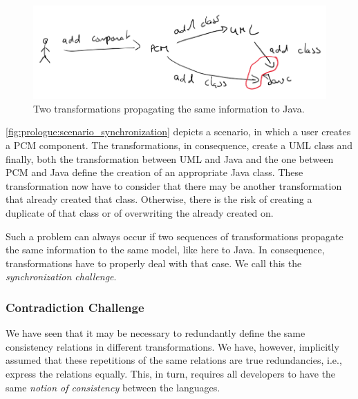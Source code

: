 \begin{figure}
    \centering
    \includegraphics[width=\textwidth]{figures/prologue/scenario_synchronization.png}
    \caption[Example for transformation synchronization]{Two transformations propagating the same information to Java.}
    \label{fig:prologue:scenario_synchronization}
\end{figure}

\autoref{fig:prologue:scenario_synchronization} depicts a scenario, in which a user creates a \gls{PCM} component.
The transformations, in consequence, create a \gls{UML} class and finally, both the transformation between \gls{UML} and Java and the one between \gls{PCM} and Java define the creation of an appropriate Java class.
These transformation now have to consider that there may be another transformation that already created that class.
Otherwise, there is the risk of creating a duplicate of that class or of overwriting the already created on.

Such a problem can always occur if two sequences of transformations propagate the same information to the same model, like here to Java.
In consequence, transformations have to properly deal with that case.
We call this the \emph{synchronization challenge}.

\subsubsection*{Contradiction Challenge}

We have seen that it may be necessary to redundantly define the same consistency relations in different transformations.
We have, however, implicitly assumed that these repetitions of the same relations are true redundancies, i.e., express the relations equally.
This, in turn, requires all developers to have the same \emph{notion of consistency} between the languages.

